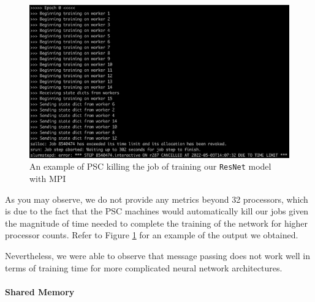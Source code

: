 \documentclass{article}
\begin{document}
\begin{figure}[!h]
    \centering
    \includegraphics[scale=0.35]{kill_res}
    \caption{An example of PSC killing the job of training our \texttt{ResNet} model with MPI}
    \label{fig:kill_res}
\end{figure}

As you may observe, we do not provide any metrics beyond 32 processors, which is due to the fact that the PSC machines would automatically kill our jobs given the magnitude of time needed to complete the training of the network for higher processor counts. Refer to Figure \ref{fig:kill_res} for an example of the output we obtained.

Nevertheless, we were able to observe that message passing does not work well in terms of training time for more complicated neural network architectures.

\paragraph{Shared Memory}
\end{document}
